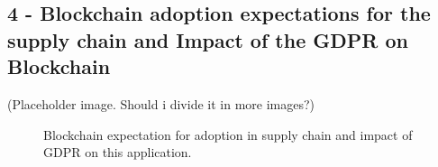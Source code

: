 
\subsection*{4 - Blockchain adoption expectations for the supply chain and Impact of the GDPR on Blockchain}
 
(Placeholder image. Should i divide it in more images?)

\begin{figure}[ht]

    
      \caption{Blockchain expectation for adoption in supply chain and impact of GDPR on this application.}
    \label{fig:group4_graphics}
\end{figure}